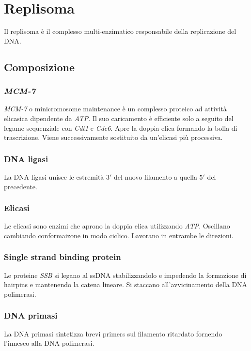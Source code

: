 \section{Replisoma}
Il replisoma \`e il complesso multi-enzimatico responsabile della replicazione del DNA.

	\subsection{Composizione}

		\subsubsection{\emph{MCM-7}}
		\emph{MCM-7} o minicromosome maintenance \`e un complesso proteico ad attivit\`a elicasica dipendente da \emph{ATP}.
		Il suo caricamento \`e efficiente solo a seguito del legame sequenziale con \emph{Cdt1} e \emph{Cdc6}.
		Apre la doppia elica formando la bolla di trascrizione.
		Viene successivamente sostituito da un'elicasi pi\`u processiva.

		\subsubsection{DNA ligasi}
		La DNA ligasi unisce le estremit\`a $3'$ del nuovo filamento a quella $5'$ del precedente.

		\subsubsection{Elicasi}
		Le elicasi sono enzimi che aprono la doppia elica utilizzando \emph{ATP}.
		Oscillano cambiando conformaizone in modo ciclico.
		Lavorano in entrambe le direzioni.

		\subsubsection{Single strand binding protein}
		Le proteine \emph{SSB} si legano al ssDNA stabilizzandolo e impedendo la formazione di hairpins e mantenendo la catena lineare.
		Si staccano all'avvicinamento della DNA polimerasi.

		\subsubsection{DNA primasi}
		La DNA primasi sintetizza brevi primers sul filamento ritardato fornendo l'innesco alla DNA polimerasi.

